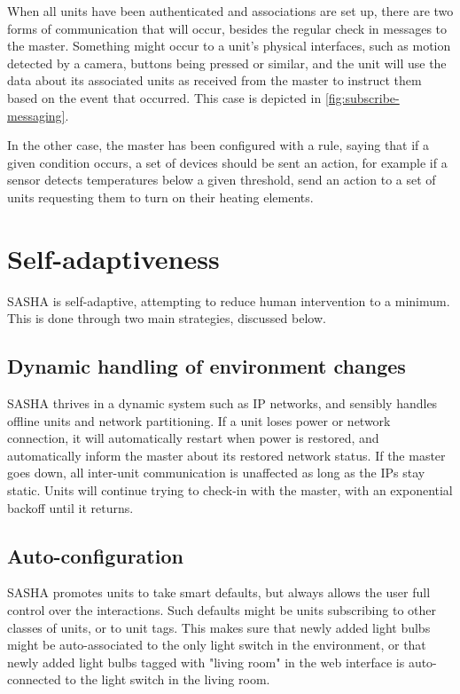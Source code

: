 When all units have been authenticated and associations are set up, there are two forms of communication that will occur, besides the regular check in messages to the master. Something might occur to a unit's physical interfaces, such as motion detected by a camera, buttons being pressed or similar, and the unit will use the data about its associated units as received from the master to instruct them based on the event that occurred. This case is depicted in \autoref{fig:subscribe-messaging}.

In the other case, the master has been configured with a rule, saying that if a given condition occurs, a set of devices should be sent an action, for example if a sensor detects temperatures below a given threshold, send an action to a set of units requesting them to turn on their heating elements.
\section{Self-adaptiveness}
SASHA is self-adaptive, attempting to reduce human intervention to a minimum. This is done through two main strategies, discussed below.

\subsection{Dynamic handling of environment changes}
SASHA thrives in a dynamic system such as IP networks, and sensibly handles offline units and network partitioning. If a unit loses power or network connection, it will automatically restart when power is restored, and automatically inform the master about its restored network status. If the master goes down, all inter-unit communication is unaffected as long as the IPs stay static. Units will continue trying to check-in with the master, with an exponential backoff until it returns.

\subsection{Auto-configuration}
SASHA promotes units to take smart defaults, but always allows the user full control over the interactions. Such defaults might be units subscribing to other classes of units, or to unit tags. This makes sure that newly added light bulbs might be auto-associated to the only light switch in the environment, or that newly added light bulbs tagged with "living room" in the web interface is auto-connected to the light switch in the living room.

